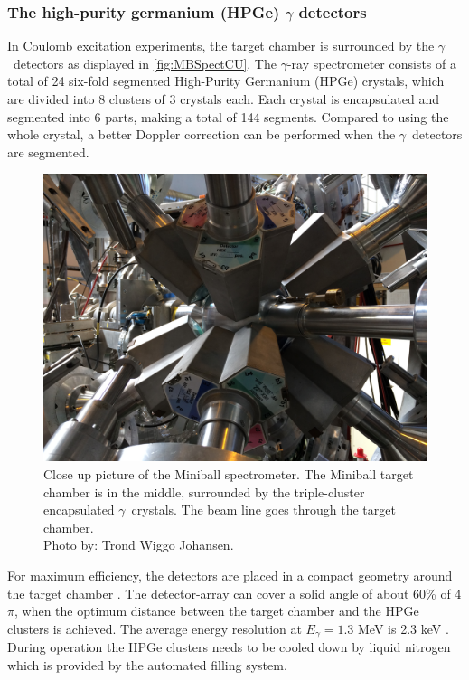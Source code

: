 \documentclass[twoside,english]{uiofysmaster/uiofysmaster}
\newcommand{\ga}{$\gamma$}
\let\orgautoref\autoref
\renewcommand{\autoref}
        {%
		 \def\sectionautorefname{Section}%
		 \def\subsectionautorefname{Section}%
		 \def\subsubsectionautorefname{Section}%
		 \def\chapterautorefname{Chapter}%
          \orgautoref}
\begin{document}
\subsubsection{The high-purity germanium (HPGe) \texorpdfstring{$\gamma$}{Gamma} detectors}
In Coulomb excitation experiments, the target chamber is surrounded by the \ga\ detectors as displayed in \autoref{fig:MBSpectCU}. 
The \ga-ray spectrometer consists of a total of 24 six-fold segmented High-Purity Germanium (HPGe) crystals, which are divided into 8 clusters of 3 crystals each. 
Each crystal is encapsulated and segmented into 6 parts, making a total of 144 segments. 
Compared to using the whole crystal, a better Doppler correction can be performed when the \ga\ detectors are segmented. 

\begin{figure}[htb]
	\centering
	\includegraphics[width=\linewidth]{Images/IMG3917.JPG}
	\caption{Close up picture of the Miniball spectrometer. The Miniball target chamber is in the middle, surrounded by the triple-cluster encapsulated \ga\ crystals. The beam line goes through the target chamber. \\ Photo by: Trond Wiggo Johansen.}
	\label{fig:MBSpectCU}
\end{figure}

For maximum efficiency, the detectors are placed in a compact geometry around the target chamber \cite{NWarr-HPGe, MB-spect}. 
The detector-array can cover a solid angle of about 60\% of 4$\pi$, when the optimum distance between the target chamber and the HPGe clusters is achieved. 
The average energy resolution at $E_\gamma = 1.3$ MeV is 2.3 keV \cite{Butler2017}. 
During operation the HPGe clusters needs to be cooled down by liquid nitrogen which is provided by the automated filling system. 
\end{document}
